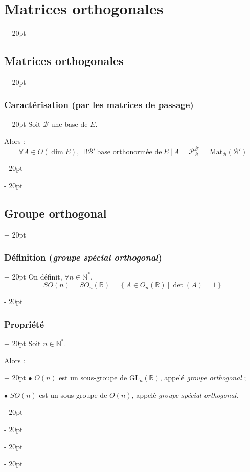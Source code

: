 \documentclass[a4paper, 12pt, twoside]{article}
\newcommand{\N}{\mathbb{N}} %
\newcommand{\R}{\mathbb{R}} %
\newcommand{\set}[1]{\left\{ #1 \right\}}
\newcommand{\ind}[1][20pt]{\advance\leftskip + #1}
\newcommand{\deind}[1][20pt]{\advance\leftskip - #1}
\newenvironment{indt}[2][20pt]{#2 \par \ind[#1]}{\par \deind} %
\begin{document}
\begin{indt}{\section{Matrices orthogonales}}
\begin{indt}{\subsection{Matrices orthogonales}}
            \vspace{12pt}
            
            \begin{indt}{\subsubsection{Caractérisation (par les matrices de passage)}}
                Soit $\mathcal B$ une base de $E$.

                Alors :
                \[
                    \forall A \in O(\dim E),\
                    \exists! \mathcal B'\ \text{base orthonormée de}\ E\ |\
                    A = \mathcal P_{\mathcal B}^{\mathcal B'}
                    = \mathrm{Mat}_{\mathcal B}(\mathcal B')
                \]
            \end{indt}
        \end{indt}

        \vspace{12pt}
        
        \begin{indt}{\subsection{Groupe orthogonal}}
            \begin{indt}{\subsubsection{Définition (\textit{groupe spécial orthogonal})}}
                On définit, $\forall n \in \N^*$,
                \[
                    SO(n) = SO_n(\R) = \set{A \in O_n(\R)\ |\ \det(A) = 1}
                \]
            \end{indt}

            \vspace{12pt}
            
            \begin{indt}{\subsubsection{Propriété}}
                Soit $n \in \N^*$.

                \begin{indt}{Alors :}
                    $\bullet$ $O(n)$ est un sous-groupe de $\mathrm{GL}_n(\R)$, appelé \emph{groupe orthogonal} ;

                    $\bullet$ $SO(n)$ est un sous-groupe de $O(n)$, appelé \emph{groupe spécial orthogonal}.
                \end{indt}
            \end{indt}


\end{indt}
\end{indt}
\end{document}
